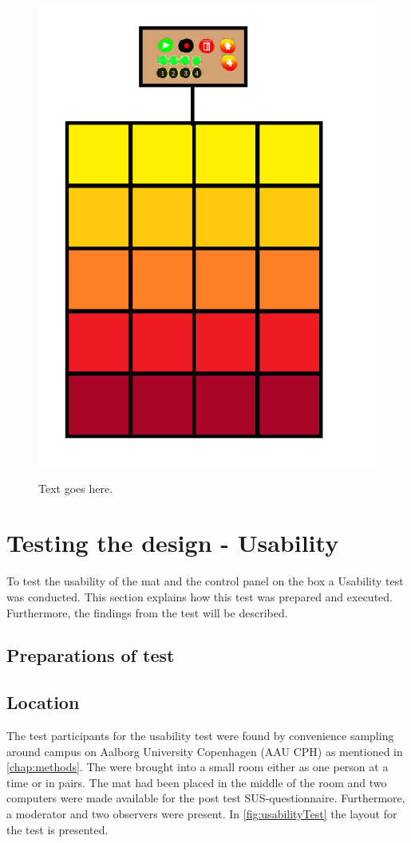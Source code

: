 \begin{figure}[H]
	\centering
	\includegraphics[width=0.7\linewidth]{figure/Design/designFinal}
	\label{fig:designFinal}
	\caption{Text goes here.}	
\end{figure}













\section{Testing the design - Usability}
To test the usability of the mat and the control panel on the box a Usability test was conducted. This section explains how this test was prepared and executed. Furthermore, the findings from the test will be described.

\subsection{Preparations of test}


\subsection{Location}
The test participants for the usability test were found by convenience sampling around campus on Aalborg University Copenhagen (AAU CPH) as mentioned in \ref{chap:methods}. The were brought into a small room either as one person at a time or in pairs. The mat had been placed in the middle of the room and two computers were made available for the post test SUS-questionnaire. Furthermore, a moderator and two observers were present. In \autoref{fig:usabilityTest} the layout for the test is presented.

